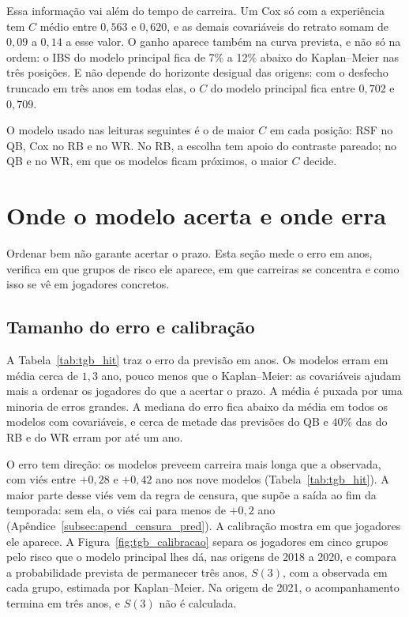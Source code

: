 Essa informação vai além do tempo de carreira. Um Cox só com a experiência tem $C$ médio entre $0{,}563$ e $0{,}620$, e as demais covariáveis do retrato somam de $0{,}09$ a $0{,}14$ a esse valor. O ganho aparece também na curva prevista, e não só na ordem: o IBS do modelo principal fica de 7\% a 12\% abaixo do Kaplan--Meier nas três posições. E não depende do horizonte desigual das origens: com o desfecho truncado em três anos em todas elas, o $C$ do modelo principal fica entre $0{,}702$ e $0{,}709$.

O modelo usado nas leituras seguintes é o de maior $C$ em cada posição: RSF no QB, Cox no RB e no WR. No RB, a escolha tem apoio do contraste pareado; no QB e no WR, em que os modelos ficam próximos, o maior $C$ decide.

\section{Onde o modelo acerta e onde erra}
\label{sec:acerto_horizonte}

Ordenar bem não garante acertar o prazo. Esta seção mede o erro em anos, verifica em que grupos de risco ele aparece, em que carreiras se concentra e como isso se vê em jogadores concretos.

\subsection{Tamanho do erro e calibração}
\label{sec:calibracao_risco}

A Tabela~\ref{tab:tgb_hit} traz o erro da previsão em anos. Os modelos erram em média cerca de $1{,}3$ ano, pouco menos que o Kaplan--Meier: as covariáveis ajudam mais a ordenar os jogadores do que a acertar o prazo. A média é puxada por uma minoria de erros grandes. A mediana do erro fica abaixo da média em todos os modelos com covariáveis, e cerca de metade das previsões do QB e $40\%$ das do RB e do WR erram por até um ano.

O erro tem direção: os modelos preveem carreira mais longa que a observada, com viés entre $+0{,}28$ e $+0{,}42$ ano nos nove modelos (Tabela~\ref{tab:tgb_hit}). A maior parte desse viés vem da regra de censura, que supõe a saída ao fim da temporada: sem ela, o viés cai para menos de $+0{,}2$ ano (Apêndice~\ref{subsec:apend_censura_pred}). A calibração mostra em que jogadores ele aparece. A Figura~\ref{fig:tgb_calibracao} separa os jogadores em cinco grupos pelo risco que o modelo principal lhes dá, nas origens de 2018 a 2020, e compara a probabilidade prevista de permanecer três anos, $S(3)$, com a observada em cada grupo, estimada por Kaplan--Meier. Na origem de 2021, o acompanhamento termina em três anos, e $S(3)$ não é calculada.

